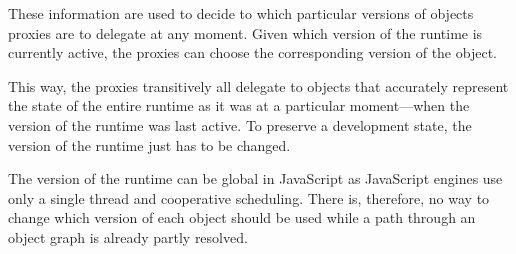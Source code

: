 These information are used to decide to which particular versions of objects proxies are to delegate at any moment.
Given which version of the runtime is currently active, the proxies can choose the corresponding version of the object.


This way, the proxies transitively all delegate to objects that accurately represent the state of the entire runtime as it was at a particular moment---when the version of the runtime was last active.
To preserve a development state, the version of the runtime just has to be changed.




The version of the runtime can be global in JavaScript as JavaScript engines use only a single thread and cooperative scheduling.
There is, therefore, no way to change which version of each object should be used while a path through an object graph is already partly resolved.
